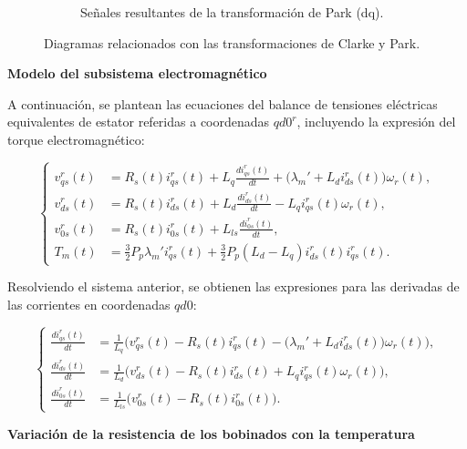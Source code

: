 \documentclass{article}
\begin{document}
\begin{figure}[H]
\begin{subfigure}[b]{0.6\textwidth}
        \caption{Señales resultantes de la transformación de Park (dq).}
        \label{fig:transformacion_park}
    \end{subfigure}
    \caption{Diagramas relacionados con las transformaciones de Clarke y Park.}
    \label{fig:transformaciones_clarke_park}
\end{figure}



\textbf{Modelo del subsistema electromagnético}

A continuación, se plantean las ecuaciones del balance de tensiones eléctricas equivalentes de estator referidas a coordenadas \(qd0^r\), incluyendo la expresión del torque electromagnético:


\begin{equation}
\left\{
\begin{aligned}
    v_{qs}^r(t) &= R_s(t) i_{qs}^r(t) + L_q \frac{d i_{qs}^r(t)}{dt} + \big(\lambda_m' + L_d i_{ds}^r(t)\big) \omega_r(t), \\
    v_{ds}^r(t) &= R_s(t) i_{ds}^r(t) + L_d \frac{d i_{ds}^r(t)}{dt} - L_q i_{qs}^r(t) \omega_r(t), \\
    v_{0s}^r(t) &= R_s(t) i_{0s}^r(t) + L_{ls} \frac{d i_{0s}^r(t)}{dt}, \\
    T_m(t) &= \frac{3}{2} P_p \lambda_m' i_{qs}^r(t) + \frac{3}{2} P_p (L_d - L_q) i_{ds}^r(t) i_{qs}^r(t).
\end{aligned}
\right.
\label{eq:SubsistemaElectromagnetico}
\end{equation}

Resolviendo el sistema anterior, se obtienen las expresiones para las derivadas de las corrientes en coordenadas \(qd0\):

\begin{equation}
\left\{
\begin{aligned}
    \frac{d i_{qs}^r(t)}{dt} &= \frac{1}{L_q} \Big( v_{qs}^r(t) - R_s(t) i_{qs}^r(t) - \big(\lambda_m' + L_d i_{ds}^r(t)\big) \omega_r(t) \Big), \\
    \frac{d i_{ds}^r(t)}{dt} &= \frac{1}{L_d} \Big( v_{ds}^r(t) - R_s(t) i_{ds}^r(t) + L_q i_{qs}^r(t) \omega_r(t) \Big), \\
    \frac{d i_{0s}^r(t)}{dt} &= \frac{1}{L_{ls}} \Big( v_{0s}^r(t) - R_s(t) i_{0s}^r(t) \Big).
\end{aligned}
\right.
\end{equation}

\textbf{Variación de la resistencia de los bobinados con la temperatura}
\end{document}
